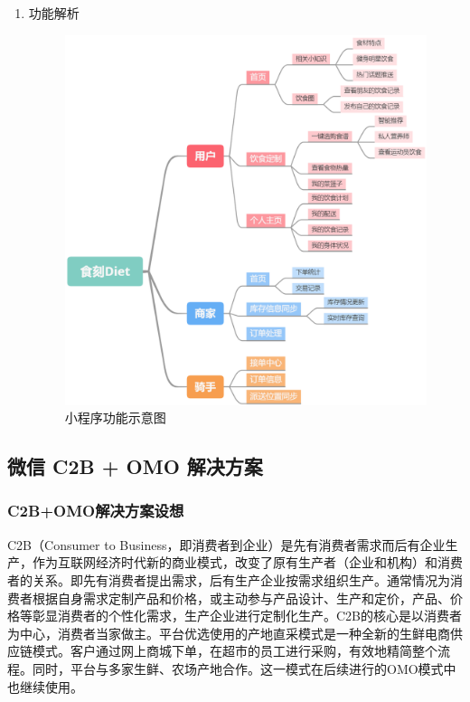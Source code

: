 \documentclass[UTF8,12pt]{ctexart}
\numberwithin{figure}{section}%
\begin{document}
\begin{spacing}{2}
\begin{enumerate}
	\newpage
	
	\item 功能解析	
	\begin{figure}[!htb]
		\centering
		\includegraphics[width=14cm]{fig/Diet}
		\caption{小程序功能示意图}
	\end{figure}
	
	
	
\end{enumerate}


\subsection{ 微信 C2B + OMO 解决方案}
\subsubsection{C2B+OMO解决方案设想}

C2B（Consumer to Business，即消费者到企业）是先有消费者需求而后有企业生产，作为互联网经济时代新的商业模式，改变了原有生产者（企业和机构）和消费者的关系。即先有消费者提出需求，后有生产企业按需求组织生产。通常情况为消费者根据自身需求定制产品和价格，或主动参与产品设计、生产和定价，产品、价格等彰显消费者的个性化需求，生产企业进行定制化生产。C2B的核心是以消费者为中心，消费者当家做主。平台优选使用的产地直采模式是一种全新的生鲜电商供应链模式。客户通过网上商城下单，在超市的员工进行采购，有效地精简整个流程。同时，平台与多家生鲜、农场产地合作。这一模式在后续进行的OMO模式中也继续使用。


\end{spacing}
\end{document}
